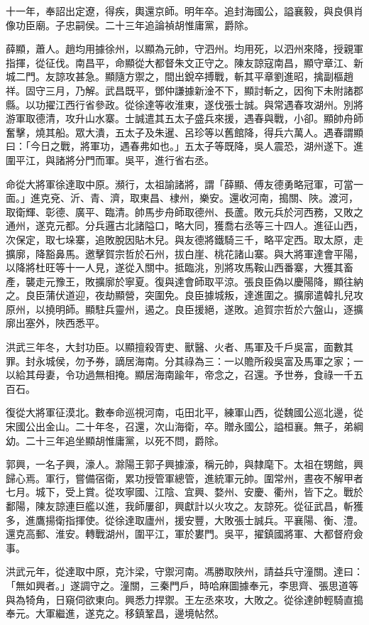 \begin{pinyinscope}
十一年，奉詔出定遼，得疾，輿還京師。明年卒。追封海國公，謚襄毅，與良俱肖像功臣廟。子忠嗣侯。二十三年追論禎胡惟庸黨，爵除。

薛顯，蕭人。趙均用據徐州，以顯為元帥，守泗州。均用死，以泗州來降，授親軍指揮，從征伐。南昌平，命顯從大都督朱文正守之。陳友諒寇南昌，顯守章江、新城二門。友諒攻甚急。顯隨方禦之，間出銳卒搏戰，斬其平章劉進昭，擒副樞趙祥。固守三月，乃解。武昌既平，鄧仲謙據新淦不下，顯討斬之，因徇下未附諸郡縣。以功擢江西行省參政。從徐達等收淮東，遂伐張士誠。與常遇春攻湖州。別將游軍取德清，攻升山水寨。士誠遣其五太子盛兵來援，遇春與戰，小卻。顯帥舟師奮擊，燒其船。眾大潰，五太子及朱暹、呂珍等以舊館降，得兵六萬人。遇春謂顯曰：「今日之戰，將軍功，遇春弗如也。」五太子等既降，吳人震恐，湖州遂下。進圍平江，與諸將分門而軍。吳平，進行省右丞。

命從大將軍徐達取中原。瀕行，太祖諭諸將，謂「薛顯、傅友德勇略冠軍，可當一面。」進克兗、沂、青、濟，取東昌、棣州，樂安。還收河南，搗關、陜。渡河，取衛輝、彰德、廣平、臨清。帥馬步舟師取德州、長蘆。敗元兵於河西務，又敗之通州，遂克元都。分兵邏古北諸隘口，略大同，獲喬右丞等三十四人。進征山西，次保定，取七垛寨，追敗脫因貼木兒。與友德將鐵騎三千，略平定西。取太原，走擴廓，降豁鼻馬。邀擊賀宗哲於石州，拔白崖、桃花諸山寨。與大將軍達會平陽，以降將杜旺等十一人見，遂從入關中。抵臨洮，別將攻馬鞍山西番寨，大獲其畜產，襲走元豫王，敗擴廓於寧夏。復與達會師取平涼。張良臣偽以慶陽降，顯往納之。良臣蒲伏道迎，夜劫顯營，突圍免。良臣據城叛，達進圍之。擴廓遣韓扎兒攻原州，以撓明師。顯駐兵靈州，遏之。良臣援絕，遂敗。追賀宗哲於六盤山，逐擴廓出塞外，陜西悉平。

洪武三年冬，大封功臣。以顯擅殺胥吏、獸醫、火者、馬軍及千戶吳富，面數其罪。封永城侯，勿予券，謫居海南。分其祿為三：一以贍所殺吳富及馬軍之家；一以給其母妻，令功過無相掩。顯居海南踰年，帝念之，召還。予世券，食祿一千五百石。

復從大將軍征漠北。數奉命巡視河南，屯田北平，練軍山西，從魏國公巡北邊，從宋國公出金山。二十年冬，召還，次山海衛，卒。贈永國公，謚桓襄。無子，弟綱幼。二十三年追坐顯胡惟庸黨，以死不問，爵除。

郭興，一名子興，濠人。滁陽王郭子興據濠，稱元帥，與隸麾下。太祖在甥館，興歸心焉。軍行，嘗備宿衛，累功授管軍總管，進統軍元帥。圍常州，晝夜不解甲者七月。城下，受上賞。從攻寧國、江陰、宜興、婺州、安慶、衢州，皆下之。戰於鄱陽，陳友諒連巨艦以進，我師屢卻，興獻計以火攻之。友諒死。從征武昌，斬獲多，進鷹揚衛指揮使。從徐達取廬州，援安豐，大敗張士誠兵。平襄陽、衡、澧。還克高郵、淮安。轉戰湖州，圍平江，軍於婁門。吳平，擢鎮國將軍、大都督府僉事。

洪武元年，從達取中原，克汴梁，守禦河南。馮勝取陜州，請益兵守潼關。達曰：「無如興者。」遂調守之。潼關，三秦門戶，時哈麻圖據奉元，李思齊、張思道等與為犄角，日窺伺欲東向。興悉力捍禦。王左丞來攻，大敗之。從徐達帥輕騎直搗奉元。大軍繼進，遂克之。移鎮鞏昌，邊境帖然。


\end{pinyinscope}
